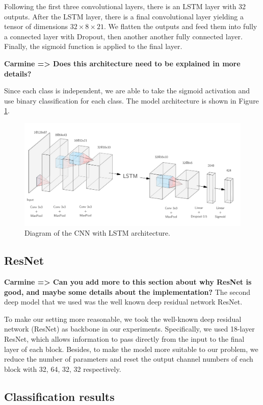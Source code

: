 \documentclass{article}
\newcommand{\carmine}[1]{\textbf{\color{red} Carmine => #1}}
\begin{document}
Following the first three convolutional layers, there is an LSTM layer with 32 outputs. After the LSTM layer, there is a final convolutional layer yielding a tensor of dimensions $32\times 8 \times 21$. We flatten the outputs and feed them into fully a connected layer with Dropout, then another another fully connected layer. Finally, the sigmoid function is applied to the final layer. 

\carmine{Does this architecture need to be explained in more details?}

Since each class is independent, we are able to take the sigmoid activation and use binary classification for each class. The model architecture is shown in Figure \ref{cnn_lstm}.

\begin{figure}
\includegraphics[scale=0.45]{CNN_LSTM_diagram.png}
\caption{Diagram of the CNN with LSTM architecture. \label{cnn_lstm}}
\end{figure}


\subsection{ResNet}
\carmine{Can you add more to this section about why ResNet is good, and maybe some details about the implementation?}
The second deep model that we used was the well known deep residual network ResNet.

To make our setting more reasonable, we took the well-known deep residual network (ResNet) as backbone in our experiments. Specifically, we used 18-layer ResNet, which allows information to pass directly from the input to the final layer of each block. Besides, to make the model more suitable to our problem, we reduce the number of parameters and reset the output channel numbers of each block with 32, 64, 32, 32 respectively.

\subsection{Classification results}
\end{document}
